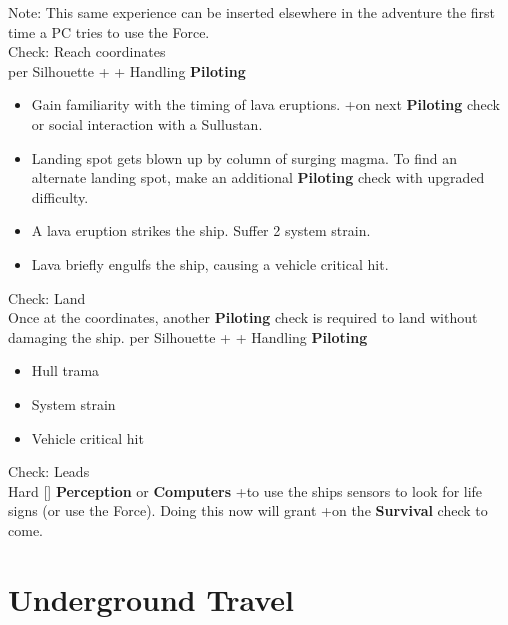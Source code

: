 \documentclass{book}
\newcommand{\df}{\difficulty}
\newcommand{\stb}{\setback}
\begin{document}
\begin{multicols*}{2}
Note: This same experience can be inserted elsewhere in the adventure the first time a PC tries to use the Force.\\
Check: Reach coordinates\\
\difficulty per Silhouette + \stb\stb\stb + Handling \textbf{Piloting}

\begin{itemize}
    \item \advantage Gain familiarity with the timing of lava eruptions.  +\boost on next \textbf{Piloting} check or social interaction with a Sullustan.
    \item \failure Landing spot gets blown up by column of surging magma. To find an alternate landing spot, make an additional \textbf{Piloting} check with upgraded difficulty.
	\item \threat \threat A lava eruption strikes the ship.  Suffer 2 system strain.
	\item \despair Lava briefly engulfs the ship, causing a vehicle critical hit.
\end{itemize}
Check: Land\\
Once at the coordinates, another \textbf{Piloting} check is required to land without damaging the ship.
\difficulty per Silhouette + \stb\stb + Handling \textbf{Piloting}
\begin{itemize}
    \item \failure Hull trama
    \item \threat System strain
	\item \despair Vehicle critical hit
\end{itemize}
Check: Leads\\
Hard [\df\df\df] \textbf{Perception} or \textbf{Computers} +\setback to use the ships sensors to look for life signs (or use the Force). Doing this now will grant +\boost on the \textbf{Survival} check to come.

\section{Underground Travel}


\end{multicols*}
\end{document}
